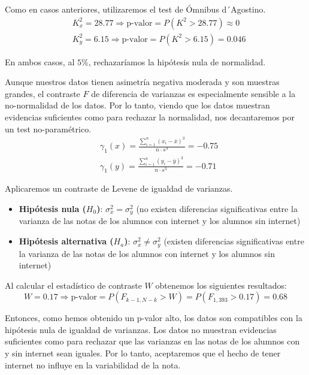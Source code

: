 Como en casos anteriores, utilizaremos el test de Ómnibus d´Agostino.
\begin{equation*}
    \begin{split}
        & K_{x}^2 = 28.77 \Rightarrow \text{p-valor} = P(K^2 > 28.77) \approx 0\\
        & K_{y}^2 = 6.15 \Rightarrow \text{p-valor} = P(K^2 > 6.15) = 0.046
    \end{split}
\end{equation*}

En ambos casos, al $5 \%$, rechazaríamos la hipótesis nula de normalidad.

Aunque nuestros datos tienen asimetría negativa moderada y son muestras grandes, el contraste $F$ de diferencia de varianzas es especialmente sensible a la no-normalidad de los datos. Por lo tanto, viendo que los datos muestran evidencias suficientes como para rechazar la normalidad, nos decantaremos por un test no-paramétrico.
\begin{equation*}
    \begin{split}
        & \gamma_{1}(x) = \frac{\sum_{i=1}^{n}(x_i - \bar{x})^3}{n \cdot s^3} = -0.75\\
        & \gamma_{1}(y) = \frac{\sum_{i=1}^{n}(y_i - \bar{y})^3}{n \cdot s^3} = -0.71
    \end{split} 
\end{equation*}

Aplicaremos un contraste de Levene de igualdad de varianzas.

\begin{itemize}
    \item \textbf{Hipótesis nula ($H_0$)}: $\sigma_{x}^2 = \sigma_{y}^2$ (no existen diferencias significativas entre la varianza de las notas de los alumnos con internet y los alumnos sin internet)
    \item \textbf{Hipótesis alternativa ($H_a$)}: $\sigma_{x}^2 \neq \sigma_{y}^2$ (existen diferencias significativas entre la varianza de las notas de los alumnos con internet y los alumnos sin internet)
\end{itemize}

Al calcular el estadístico de contraste $W$ obtenemos los siguientes resultados:
\begin{equation*}
    W = 0.17 \Rightarrow \text{p-valor} = P(F_{k-1,N-k} > W) = P(F_{1, 393} > 0.17) = 0.68
\end{equation*}

Entonces, como hemos obtenido un p-valor alto, los datos son compatibles con la hipótesis nula de igualdad de varianzas. Los datos no muestran evidencias suficientes como para rechazar que las varianzas en las notas de los alumnos con y sin internet sean iguales. Por lo tanto, aceptaremos que el hecho de tener internet no influye en la variabilidad de la nota.
